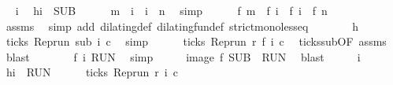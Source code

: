 \begin{isabellebody}
\ \isamarkupfalse%
\ i\ \isamarkupfalse%
\ h{\isacharcolon}{\isacartoucheopen}i\ {\isasymin}\ {\isacharquery}SUB{\isacartoucheclose}\isanewline
\ \ \ \ \isamarkupfalse%
\ {\isacartoucheopen}m\ {\isasymle}\ i\ {\isasymand}\ i\ {\isasymle}\ n{\isacartoucheclose}\ \isamarkupfalse%
\ simp\isanewline
\ \ \ \ \isamarkupfalse%
\ {\isacartoucheopen}f\ m\ {\isasymle}\ f\ i\ {\isasymand}\ f\ i\ {\isasymle}\ {\isacharparenleft}f\ n{\isacharparenright}{\isacartoucheclose}\isanewline
\ \ \ \ \ \ \isamarkupfalse%
\ assms\ \isamarkupfalse%
\ {\isacharparenleft}simp\ add{\isacharcolon}\ dilating{\isacharunderscore}def\ dilating{\isacharunderscore}fun{\isacharunderscore}def\ strict{\isacharunderscore}mono{\isacharunderscore}less{\isacharunderscore}eq{\isacharparenright}\isanewline
\ \ \ \ \isamarkupfalse%
\ \isamarkupfalse%
\ h\ \isamarkupfalse%
\ {\isacartoucheopen}ticks\ {\isacharparenleft}{\isacharparenleft}Rep{\isacharunderscore}run\ sub{\isacharparenright}\ i\ c{\isacharparenright}{\isacartoucheclose}\ \isamarkupfalse%
\ simp\isanewline
\ \ \ \ \isamarkupfalse%
\ {\isacartoucheopen}ticks\ {\isacharparenleft}{\isacharparenleft}Rep{\isacharunderscore}run\ r{\isacharparenright}\ {\isacharparenleft}f\ i{\isacharparenright}\ c{\isacharparenright}{\isacartoucheclose}\ \isamarkupfalse%
\ ticks{\isacharunderscore}sub{\isacharbrackleft}OF\ assms{\isacharbrackright}\ \isamarkupfalse%
\ blast\isanewline
\ \ \ \ \isamarkupfalse%
\ \isamarkupfalse%
\ {\isacartoucheopen}f\ i\ {\isasymin}{\isacharquery}RUN{\isacartoucheclose}\ \isamarkupfalse%
\ simp\isanewline
\ \ \isacommand{{\isacharbraceright}}\isamarkupfalse%
\ \isamarkupfalse%
\ {\isacartoucheopen}image\ f\ {\isacharquery}SUB\ {\isasymsubseteq}\ {\isacharquery}RUN{\isacartoucheclose}\ \isamarkupfalse%
\ blast\isanewline
{}\isamarkupfalse%
\isanewline
\ \ \isacommand{{\isacharbraceleft}}\isamarkupfalse%
\ \isamarkupfalse%
\ i\ \isamarkupfalse%
\ h{\isacharcolon}{\isacartoucheopen}i\ {\isasymin}\ {\isacharquery}RUN{\isacartoucheclose}\isanewline
\ \ \ \ \isamarkupfalse%
\ {\isacartoucheopen}ticks\ {\isacharparenleft}{\isacharparenleft}Rep{\isacharunderscore}run\ r{\isacharparenright}\ i\ c{\isacharparenright}{\isacartoucheclose}\ \isamarkupfalse%

\end{isabellebody}
